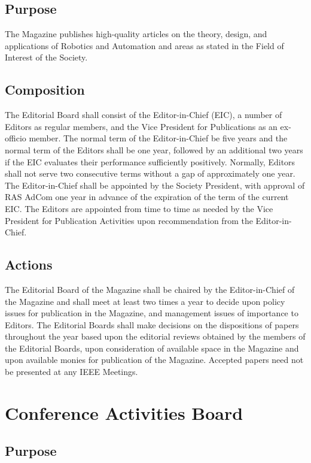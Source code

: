 \documentclass[10pt]{article}
\begin{document}
\subsection{Purpose}

The Magazine publishes high-quality articles on the theory, design, and applications of Robotics and Automation and areas as stated in the Field of Interest of the Society.


\subsection{Composition}
\label{MEB:Composition}
The Editorial Board shall consist of the Editor-in-Chief (EIC), a number of Editors as regular members, and the Vice President for Publications as an ex-officio member.  The normal term of the Editor-in-Chief be five years and the normal term of the Editors shall be one year, followed by an additional two years if the EIC evaluates their performance sufficiently positively. Normally, Editors shall not serve two consecutive terms without a gap of approximately one year.  The Editor-in-Chief shall be appointed by the Society President, with approval of RAS AdCom one year in advance of the expiration of the term of the current EIC.  The Editors are appointed from time to time as needed by the Vice President for Publication Activities upon recommendation from the Editor-in-Chief.


\subsection{Actions}
The Editorial Board of the Magazine shall be chaired by the Editor-in-Chief of the Magazine and shall meet at least two times a year to decide upon policy issues for publication in the Magazine, and management issues of importance to Editors.  The Editorial Boards shall make decisions on the dispositions of papers throughout the year based upon the editorial reviews obtained by the members of the Editorial Boards, upon consideration of available space in the Magazine and upon available monies for publication of the Magazine. Accepted papers need not be presented at any IEEE Meetings.


\section{Conference Activities Board}
\label{CAB}

\subsection{Purpose}
\end{document}
